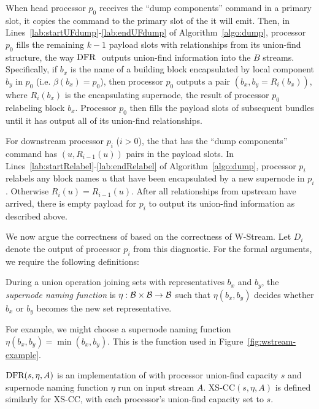 When head processor $p_0$ receives the ``dump components'' command in a primary slot, it copies the command to the primary slot of the \bundle it will emit. 
Then, in Lines~\ref{lab:startUFdump}-\ref{lab:endUFdump} of Algorithm~\ref{algo:dump}, processor $p_0$ fills the remaining $k-1$ payload slots with relationships from its union-find structure, the way $\mbox{DFR\ }$ outputs union-find information into the $B$ streams. Specifically, if $b_x$ is the name of a building block encapsulated by local component $b_y$ in $p_0$ (i.e. $\beta(b_x) = p_0$), then processor $p_0$ outputs a pair $(b_x, b_y = R_i(b_x))$, where $R_i(b_x)$ is the encapsulating supernode, the result of processor $p_0$ relabeling block $b_x$.  Processor $p_0$ then fills the payload slots of subsequent bundles until it has output all of its union-find relationships.

For downstream processor $p_i$ ($i > 0$), the \bundle that has the ``dump components'' command has $(u,R_{i-1}(u))$ pairs in the payload slots. In Lines~\ref{lab:startRelabel}-\ref{lab:endRelabel} of Algorithm~\ref{algo:dump}, processor $p_i$ relabels any block names $u$ that have been encapsulated by a new supernode in $p_i$. Otherwise $R_i(u) = R_{i-1}(u)$. After all relationships from upstream have arrived, there is empty payload for $p_i$ to output its union-find information as described above.

We now argue the correctness of \XSCC based on the correctness of
W-Stream. Let $D_i$ denote the output of processor $p_i$ from this diagnostic.  For the formal arguments, we require the following definitions:

\begin{definition}
During a union operation joining sets with representatives $b_x$ and $b_y$,
the \emph{supernode naming function} is $\eta: {\cal B} \times {\cal B} \rightarrow {\cal B}$ such
that $\eta(b_x,b_y)$ decides
whether $b_x$ or $b_y$ becomes the new set representative.
\end{definition}
For example, we
might choose a supernode naming function $\eta(b_x,b_y) = \min(b_x,b_y)$. This
is the function used in Figure~\ref{fig:wstream-example}.

\begin{definition}
\label{def:alg-with-params}
$\mbox{DFR}(s, \eta, A)$ is an implementation of \DFR with
processor union-find capacity $s$ and supernode naming function
$\eta$ run on input stream $A$. 
XS-CC$(s,\eta,A)$ is
defined similarly for XS-CC, with each processor's union-find
capacity set to $s$.
\end{definition}

